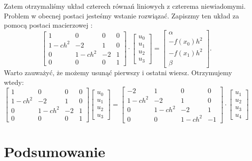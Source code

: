\documentclass[12pt,a4paper]{report}
\begin{document}
Zatem otrzymaliśmy układ czterech równań liniowych z czterema niewiadomymi. Problem w obecnej postaci jesteśmy wstanie rozwiązać. Zapiszmy ten układ za pomocą postaci macierzowej :
$$ 
\left[ \begin{array}{cccc}
1 & 0 & 0 & 0 \\
1-ch^2 & -2 & 1 & 0 \\
0 & 1-ch^2 & -2 & 1 \\
0 & 0 & 0 & 1 
\end{array} \right] \cdot
\left[ \begin{array}{c}
u_0 \\
u_1 \\
u_2 \\
u_3  
\end{array} \right] =
\left[ \begin{array}{c}
\alpha \\
-f(x_0)h^2 \\
-f(x_1)h^2\\
\beta   
\end{array} \right] .
$$
Warto zauważyć, że możemy usunąć pierwszy i ostatni wiersz. Otrzymujemy wtedy:
$$ 
\left[ \begin{array}{cccc}
1 & 0 & 0 & 0 \\
1-ch^2 & -2 & 1 & 0 \\
0 & 1-ch^2 & -2 & 1 \\
0 & 0 & 0 & 1 
\end{array} \right]
\left[ \begin{array}{c}
u_0 \\
u_1 \\
u_2 \\
u_3  
\end{array} \right] = 
\left[ \begin{array}{cccc}
-2 & 1 & 0 & 0 \\
1-ch^2 & -2 & 1 & 0 \\
0 & 1-ch^2 & -2 & 1 \\
0 & 0 & 1-ch^2 & -1 
\end{array} \right] \cdot
\left[ \begin{array}{c}
u_1 \\
u_2 \\
u_3 \\
u_4 
\end{array} \right] 
$$



\chapter{Podsumowanie}
\begin{example}[Przykład] \label{example-otwarty-euler}
\end{example}



\end{document}
